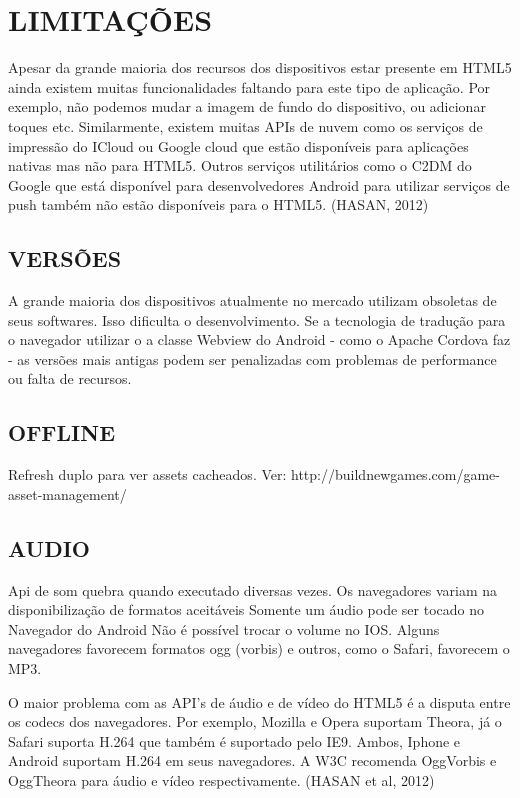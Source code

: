 \documentclass[
12pt,
a4paper,
portuges,
draft
]{report}
\begin{document}
\section{LIMITAÇÕES}

Apesar da grande maioria dos recursos dos dispositivos estar presente
em HTML5 ainda existem muitas funcionalidades faltando para este tipo
de aplicação. Por exemplo, não podemos mudar a imagem de fundo do
dispositivo, ou adicionar toques etc. Similarmente, existem muitas
APIs de nuvem como os serviços de impressão do ICloud ou Google
cloud que estão disponíveis para aplicações nativas mas não para
HTML5. Outros serviços utilitários como o C2DM do Google que está
disponível para desenvolvedores Android para utilizar serviços de push
também não estão disponíveis para o HTML5. (HASAN, 2012)

\subsection{VERSÕES}
A grande maioria dos dispositivos atualmente no mercado utilizam
obsoletas de seus softwares. Isso dificulta o desenvolvimento. Se a
tecnologia de tradução para o navegador utilizar o a classe Webview do
Android - como o Apache Cordova faz - as versões mais antigas podem ser
penalizadas com problemas de performance ou falta de recursos.

\subsection{OFFLINE}

Refresh duplo para ver assets cacheados. Ver:
http://buildnewgames.com/game-asset-management/

\subsection{AUDIO}
Api de som quebra quando executado diversas vezes.
Os navegadores variam na disponibilização de formatos aceitáveis
Somente um áudio pode ser tocado no Navegador do Android
Não é possível trocar o volume no IOS.
Alguns navegadores favorecem formatos ogg (vorbis) e outros, como o
Safari, favorecem o MP3.

O maior problema com as API's de áudio e de vídeo do HTML5 é
a disputa entre os codecs dos navegadores. Por exemplo, Mozilla e
Opera suportam Theora, já o Safari suporta H.264 que também é
suportado pelo IE9. Ambos, Iphone e Android suportam H.264 em seus
navegadores. A W3C recomenda OggVorbis e OggTheora para áudio e vídeo
respectivamente. (HASAN et al, 2012)
\end{document}
